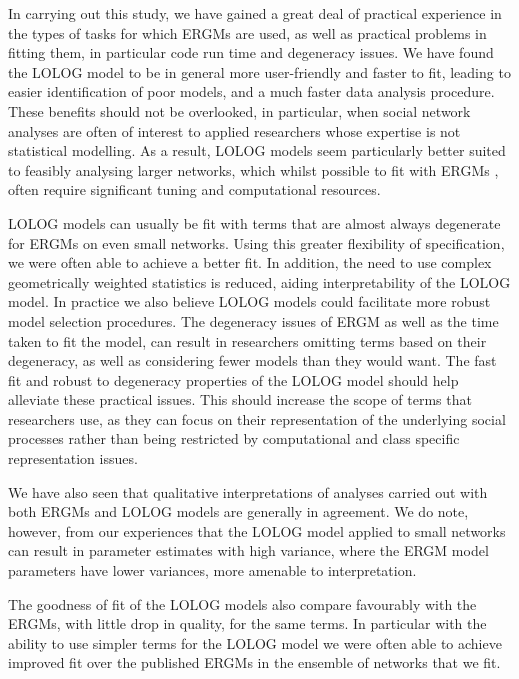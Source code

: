 \documentclass[
]{statsoc}
\begin{document}
In carrying out this study, we have gained a great deal of practical
experience in the types of tasks for which ERGMs are used, as well as
practical problems in fitting them, in particular code run time and
degeneracy issues. We have found the LOLOG model to be in general more
user-friendly and faster to fit, leading to easier identification of
poor models, and a much faster data analysis procedure. These benefits
should not be overlooked, in particular, when social network analyses
are often of interest to applied researchers whose expertise is not
statistical modelling. As a result, LOLOG models seem particularly
better suited to feasibly analysing larger networks, which whilst
possible to fit with ERGMs \citep{stivala2020}, often require
significant tuning and computational resources.

LOLOG models can usually be fit with terms that are almost always
degenerate for ERGMs on even small networks. Using this greater
flexibility of specification, we were often able to achieve a better
fit. In addition, the need to use complex geometrically weighted
statistics is reduced, aiding interpretability of the LOLOG model. In
practice we also believe LOLOG models could facilitate more robust model
selection procedures. The degeneracy issues of ERGM as well as the time
taken to fit the model, can result in researchers omitting terms based
on their degeneracy, as well as considering fewer models than they would
want. The fast fit and robust to degeneracy properties of the LOLOG
model should help alleviate these practical issues. This should increase
the scope of terms that researchers use, as they can focus on their
representation of the underlying social processes rather than being
restricted by computational and class specific representation issues.

We have also seen that qualitative interpretations of analyses carried
out with both ERGMs and LOLOG models are generally in agreement. We do
note, however, from our experiences that the LOLOG model applied to
small networks can result in parameter estimates with high variance,
where the ERGM model parameters have lower variances, more amenable to
interpretation.

The goodness of fit of the LOLOG models also compare favourably with the
ERGMs, with little drop in quality, for the same terms. In particular
with the ability to use simpler terms for the LOLOG model we were often
able to achieve improved fit over the published ERGMs in the ensemble of
networks that we fit.
\end{document}
